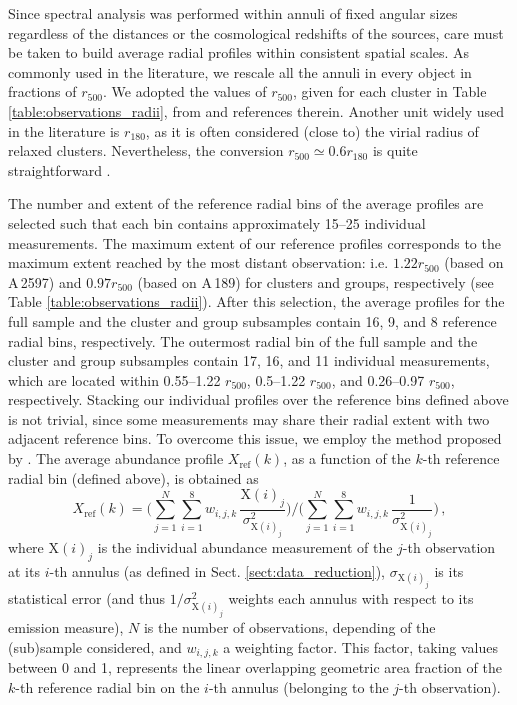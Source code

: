 \documentclass{aa}
\begin{document}
Since spectral analysis was performed within annuli of fixed angular sizes regardless of the distances or the cosmological redshifts of the sources, care must be taken to build average radial profiles within consistent spatial scales. As commonly used in the literature, we rescale all the annuli in every object in fractions of $r_{500}$. We adopted the values of $r_{500}$, given for each cluster in Table \ref{table:observations_radii}, from \citet{2015A&A...575A..38P} and references therein. Another unit widely used in the literature is $r_{180}$, as it is often considered (close to) the virial radius of relaxed clusters. Nevertheless, the conversion $r_{500} \simeq 0.6 r_{180}$ is quite straightforward \citep[e.g.][]{2013SSRv..177..195R}.

The number and extent of the reference radial bins of the average profiles are selected such that each bin contains approximately 15--25 individual measurements. The maximum extent of our reference profiles corresponds to the maximum extent reached by the most distant observation: i.e. $1.22 r_{500}$ (based on A\,2597) and $0.97 r_{500}$ (based on A\,189) for clusters and groups, respectively (see Table \ref{table:observations_radii}). After this selection, the average profiles for the full sample and the cluster and group subsamples contain 16, 9, and 8 reference radial bins, respectively. The outermost radial bin of the full sample and the cluster and group subsamples contain 17, 16, and 11 individual measurements, which are located within 0.55--1.22 $r_{500}$, 0.5--1.22 $r_{500}$, and 0.26--0.97 $r_{500}$, respectively. Stacking our individual profiles over the reference bins defined above is not trivial, since some measurements may share their radial extent with two adjacent reference bins. To overcome this issue, we employ the method proposed by \citet{2008A&A...487..461L}. The average abundance profile $X_\text{ref}(k)$, as a function of the $k$-th reference radial bin (defined above), is obtained as
\begin{equation}
X_\text{ref}(k) = \bigg( \sum_{j=1}^{N} \sum_{i=1}^{8} w_{i,j,k} \, \frac{\text{X}(i)_j}{\sigma_{\text{X}(i)_j}^2} \bigg) \bigg/ \bigg( \sum_{j=1}^{N} \sum_{i=1}^{8} w_{i,j,k} \, \frac{1}{\sigma_{\text{X}(i)_j}^2} \bigg) \, ,
\end{equation} 
where X$(i)_j$ is the individual abundance measurement of the $j$-th observation at its $i$-th annulus (as defined in Sect. \ref{sect:data_reduction}), $\sigma_{\text{X}(i)_j}$ is its statistical error (and thus $1/\sigma_{\text{X}(i)_j}^2$ weights each annulus with respect to its emission measure), $N$ is the number of observations, depending of the (sub)sample considered, and $w_{i,j,k}$ a weighting factor. This factor, taking values between 0 and 1, represents the linear overlapping geometric area fraction of the $k$-th reference radial bin on the $i$-th annulus (belonging to the $j$-th observation). 
\end{document}
